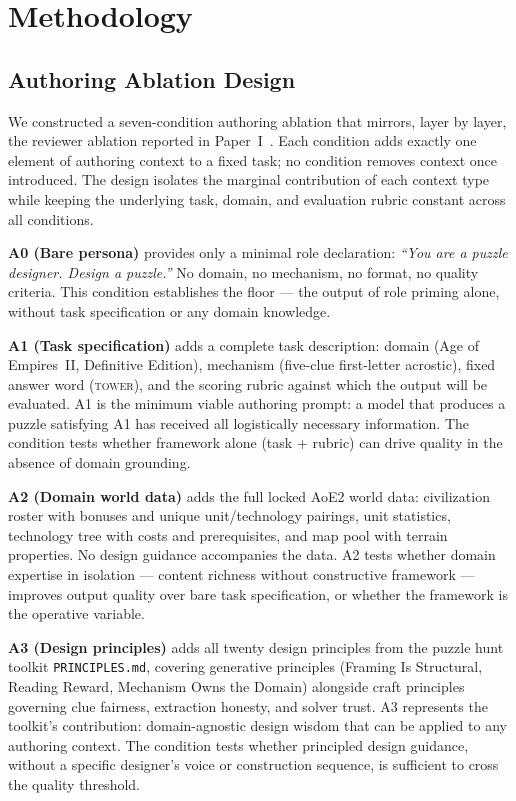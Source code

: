 \section{Methodology}

\subsection{Authoring Ablation Design}
\label{sec:ablation-design}

We constructed a seven-condition authoring ablation that mirrors, layer by layer, the reviewer ablation reported in Paper~I~\cite{paper1}. Each condition adds exactly one element of authoring context to a fixed task; no condition removes context once introduced. The design isolates the marginal contribution of each context type while keeping the underlying task, domain, and evaluation rubric constant across all conditions.

\textbf{A0 (Bare persona)} provides only a minimal role declaration: \textit{``You are a puzzle designer. Design a puzzle.''} No domain, no mechanism, no format, no quality criteria. This condition establishes the floor --- the output of role priming alone, without task specification or any domain knowledge.

\textbf{A1 (Task specification)} adds a complete task description: domain (Age of Empires~II, Definitive Edition), mechanism (five-clue first-letter acrostic), fixed answer word (\textsc{tower}), and the scoring rubric against which the output will be evaluated. A1 is the minimum viable authoring prompt: a model that produces a puzzle satisfying A1 has received all logistically necessary information. The condition tests whether framework alone (task + rubric) can drive quality in the absence of domain grounding.

\textbf{A2 (Domain world data)} adds the full locked AoE2 world data: civilization roster with bonuses and unique unit/technology pairings, unit statistics, technology tree with costs and prerequisites, and map pool with terrain properties. No design guidance accompanies the data. A2 tests whether domain expertise in isolation --- content richness without constructive framework --- improves output quality over bare task specification, or whether the framework is the operative variable.

\textbf{A3 (Design principles)} adds all twenty design principles from the puzzle hunt toolkit \texttt{PRINCIPLES.md}, covering generative principles (Framing Is Structural, Reading Reward, Mechanism Owns the Domain) alongside craft principles governing clue fairness, extraction honesty, and solver trust. A3 represents the toolkit's contribution: domain-agnostic design wisdom that can be applied to any authoring context. The condition tests whether principled design guidance, without a specific designer's voice or construction sequence, is sufficient to cross the quality threshold.

